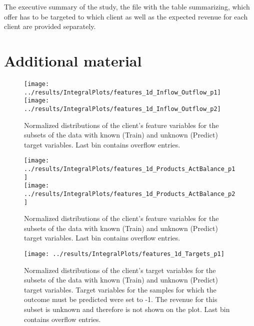 \documentclass[14pt]{scrartcl}
\begin{document}
The executive summary of the study, the file with the table
summarizing, which offer has to be targeted to which client as well as the expected 
revenue for each client are provided separately.


\clearpage
\appendix
\section{Additional material}\label{app:additional}
\begin{figure}[htpb!]
    \texttt{[image: ../results/IntegralPlots/features\_1d\_Inflow\_Outflow\_p1]}\\
    \texttt{[image: ../results/IntegralPlots/features\_1d\_Inflow\_Outflow\_p2]}
    \caption{Normalized distributions of the client's feature variables for the subsets of the
    data with known (Train) and unknown (Predict) target variables. Last bin contains
    overflow entries.}
    \label{fig:inclus_inflow_outflow1}
\end{figure}
    \newpage
\begin{figure}[htpb!]
        \texttt{[image: ../results/IntegralPlots/features\_1d\_Products\_ActBalance\_p1]}\\
        \texttt{[image: ../results/IntegralPlots/features\_1d\_Products\_ActBalance\_p2]}
        \caption{Normalized distributions of the client's feature variables for the subsets of the
        data with known (Train) and unknown (Predict) target variables. Last bin contains
        overflow entries.}
        \label{fig:inclus_products_actbalance1}
\end{figure}

\begin{figure}[htpb!]
    \texttt{[image: ../results/IntegralPlots/features\_1d\_Targets\_p1]}\\
    \caption{Normalized distributions of the client's target variables for the subsets of the
    data with known (Train) and unknown (Predict) target variables. Target variables for
    the samples for which the outcome must be predicted were set to -1. The revenue
    for this subset is unknown and therefore is not shown on the plot. Last bin contains
    overflow entries.}
    \label{fig:inclus_targets1}
\end{figure}

\clearpage
\end{document}

